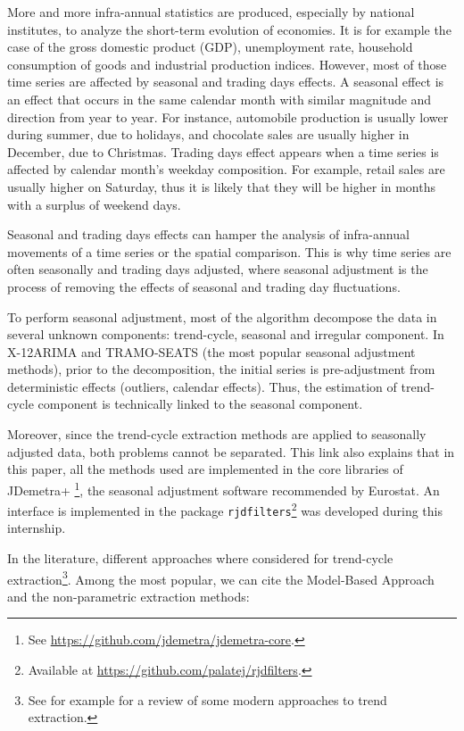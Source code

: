 \documentclass[
  12pt,
  ,
  a4paper]{article}
\newcommand\1{\mathds{1}}
\begin{document}
More and more infra-annual statistics are produced, especially by national institutes, to analyze the short-term evolution of economies.
It is for example the case of the gross domestic product (GDP), unemployment rate, household consumption of goods and industrial production indices.
However, most of those time series are affected by seasonal and trading days effects.
A seasonal effect is an effect that occurs in the same calendar month with similar magnitude and direction from year to year.
For instance, automobile production is usually lower during summer, due to holidays, and chocolate sales are usually higher in December, due to Christmas.
Trading days effect appears when a time series is affected by calendar month's weekday composition.
For example, retail sales are usually higher on Saturday, thus it is likely that they will be higher in months with a surplus of weekend days.

Seasonal and trading days effects can hamper the analysis of infra-annual movements of a time series or the spatial comparison.
This is why time series are often seasonally and trading days adjusted, where seasonal adjustment is the process of removing the effects of seasonal and trading day fluctuations.

To perform seasonal adjustment, most of the algorithm decompose the data in several unknown components: trend-cycle, seasonal and irregular component.
In X-12ARIMA and TRAMO-SEATS (the most popular seasonal adjustment methods), prior to the decomposition, the initial series is pre-adjustment from deterministic effects (outliers, calendar effects).
Thus, the estimation of trend-cycle component is technically linked to the seasonal component.

Moreover, since the trend-cycle extraction methods are applied to seasonally adjusted data, both problems cannot be separated.
This link also explains that in this paper, all the methods used are implemented in the core libraries of JDemetra+ \footnote{See \url{https://github.com/jdemetra/jdemetra-core}.}, the seasonal adjustment software recommended by Eurostat.
An  interface is implemented in the package \texttt{rjdfilters}\footnote{Available at \url{https://github.com/palatej/rjdfilters}.} was developed during this internship.

In the literature, different approaches where considered for trend-cycle extraction\footnote{See for example \textcite{alexandrov2012TEreview} for a review of some modern approaches to trend extraction.}.
Among the most popular, we can cite the Model-Based Approach and the non-parametric extraction methods:
\end{document}
